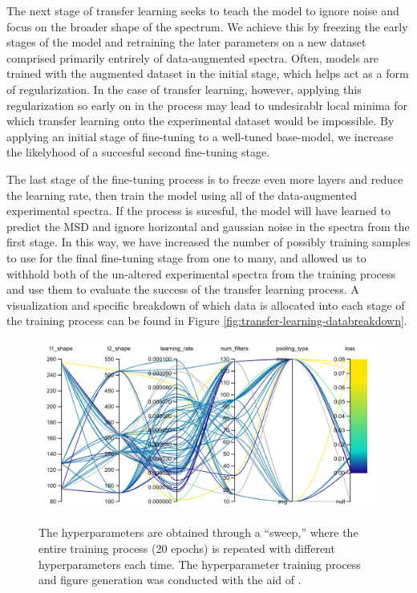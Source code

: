 The next stage of transfer learning seeks to teach the model to ignore noise and focus on the broader shape of the spectrum. We achieve this by freezing the early stages of the model and retraining the later parameters on a new dataset comprised primarily entrirely of data-augmented spectra. Often, models are trained with the augmented dataset in the initial stage, which helps act as a form of regularization. In the case of transfer learning, however, applying this regularization so early on in the process may lead to undesirablr local minima for which transfer learning onto the experimental dataset would be impossible. By applying an initial stage of fine-tuning to a well-tuned base-model, we increase the likelyhood of a succesful second fine-tuning stage.

The last stage of the fine-tuning process is to freeze even more layers and reduce the learning rate, then train the model using all of the data-augmented experimental spectra. If the process is sucesful, the model will have learned to predict the MSD and ignore horizontal and gaussian noise in the spectra from the first stage. In this way, we have increased the number of possibly training samples to use for the final fine-tuning stage from one to many, and allowed us to withhold both of the un-altered experimental spectra from the training process and use them to evaluate the success of the transfer learning process. A visualization and specific breakdown of which data is allocated into each stage of the training process can be found in Figure \ref{fig:transfer-learning-databreakdown}.

\begin{figure}
    \centering
    \includegraphics[width=\linewidth]{Chapters/Figures/new-hyperparameter-sweep-meta-1.png}
    \label{fig:meta-1-sweep-params}
    \caption[Hyperpamater Sweep 1]{The hyperparameters are obtained through a ``sweep,'' where the entire training process (20 epochs) is repeated with different hyperparameters each time. The hyperparameter training process and figure generation was conducted with the aid of \cite{wandb}.}
\end{figure}


